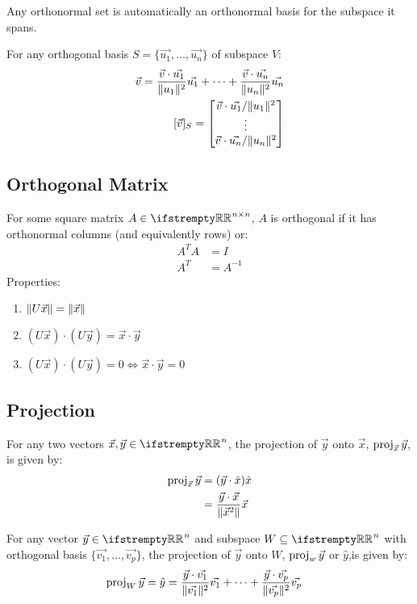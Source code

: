 \documentclass[12pt, a4paper]{article}
\begin{document}
\begin{multicols*}{3}
Any orthonormal set is automatically an orthonormal basis for the subspace it spans.

For any orthogonal basis $S = \{\vec{u_1},\ldots,\vec{u_n}\}$ of subspace $V$:
\begin{align*}
  \vec{v} = \frac{\vec{v}\cdot\vec{u_1}}{\lVert u_1\rVert^2}\vec{u_1} + \cdots +  \frac{\vec{v}\cdot\vec{u_n}}{\lVert u_n\rVert^2}\vec{u_n}\\
  [\vec{v}]_S = 
  \begin{bmatrix}
    \vec{v} \cdot \vec{u_1} / \lVert u_1\rVert^2\\
    \vdots\\
    \vec{v} \cdot \vec{u_n} / \lVert u_n\rVert^2\\
  \end{bmatrix}
\end{align*}

\subsection{Orthogonal Matrix}
For some square matrix $A \in \RR^{n{\times}n}$, $A$ is orthogonal if it has orthonormal columns (and equivalently rows) or:
\begin{align*}
  A^TA &= I \\
  A^T &= A^{-1}
\end{align*}
Properties:
\begin{enumerate}[\roman*.]
  \item $\lVert U\vec{x}\rVert = \lVert\vec{x}\rVert$
  \item $(U\vec{x})\cdot(U\vec{y}) = \vec{x}\cdot\vec{y}$
  \item $(U\vec{x})\cdot(U\vec{y}) = 0 \iff \vec{x}\cdot\vec{y} = 0$
\end{enumerate}

\colbreak

\subsection{Projection}
For any two vectors $\vec{x}, \vec{y} \in \RR^n$, the projection of $\vec{y}$ onto $\vec{x}$, $\operatorname{proj}_{\vec{x}}\vec{y}$, is given by:
\begin{align*}
  \operatorname{proj}_{\vec{x}}\vec{y} &= (\vec{y}\cdot\hat{x})\hat{x} \\
                         &= \frac{\vec{y}\cdot\vec{x}}{\lVert\vec{x}^2\rVert}\vec{x} 
\end{align*}

For any vector $\vec{y} \in \RR^n$ and subspace $W \subseteq \RR^n$ with orthogonal basis $\{\vec{v_1},\ldots,\vec{v_p}\}$, the projection of $\vec{y}$ onto $W$, $\operatorname{proj}_w\vec{y}$ or $\hat{y}$,is given by:
\begin{align*}
  \operatorname{proj}_W\vec{y} = \hat{y} &= \frac{\vec{y}\cdot\vec{v_1}}{\lVert\vec{v_1}\rVert^2}\vec{v_1} + \cdots +  \frac{\vec{y}\cdot\vec{v_p}}{\lVert\vec{v_p}\rVert^2}\vec{v_p}  
\end{align*}


\end{multicols*}
\end{document}
